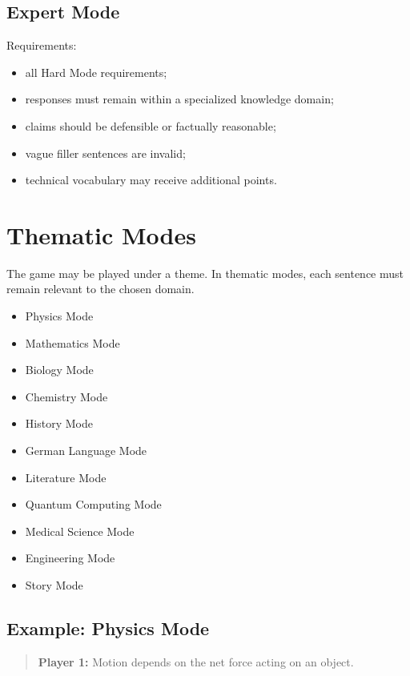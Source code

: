 \documentclass[11pt,a4paper]{article}
\begin{document}
\subsection{Expert Mode}

Requirements:

\begin{itemize}
    \item all Hard Mode requirements;
    \item responses must remain within a specialized knowledge domain;
    \item claims should be defensible or factually reasonable;
    \item vague filler sentences are invalid;
    \item technical vocabulary may receive additional points.
\end{itemize}

\section{Thematic Modes}

The game may be played under a theme. In thematic modes, each sentence must remain relevant to the chosen domain.

\begin{itemize}
    \item Physics Mode
    \item Mathematics Mode
    \item Biology Mode
    \item Chemistry Mode
    \item History Mode
    \item German Language Mode
    \item Literature Mode
    \item Quantum Computing Mode
    \item Medical Science Mode
    \item Engineering Mode
    \item Story Mode
\end{itemize}

\subsection{Example: Physics Mode}

\begin{quote}
\textbf{Player 1:} Motion depends on the net force acting on an object.
\end{quote}
\end{document}
